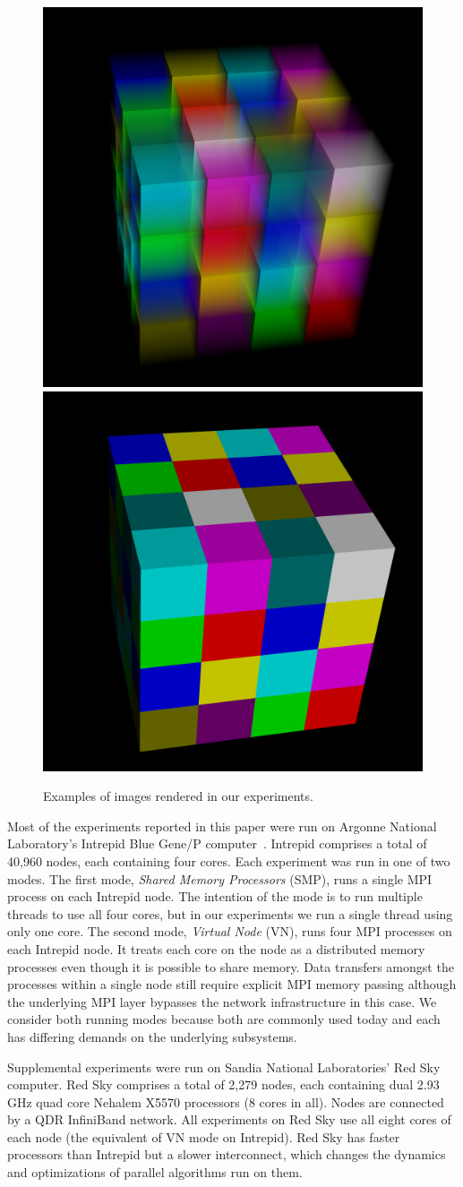 \documentclass{vgtc}                          %
\newcommand*{\lcite}[1]{~\cite{#1}}
\newcommand*{\keyterm}[1]{\emph{#1}}
\begin{document}
\begin{figure}[htbp]
  \centering
  \includegraphics[width=.4\linewidth]{images/TransparentOutput}
  \quad
  \includegraphics[width=.4\linewidth]{images/OpaqueOutput}
  \caption{Examples of images rendered in our experiments.}
  \label{fig:SimpleTimingOutput}
\end{figure}

Most of the experiments reported in this paper were run on Argonne National
Laboratory's Intrepid Blue Gene/P computer\lcite{BlueGeneP}.  Intrepid
comprises a total of 40,960 nodes, each containing four cores.  Each
experiment was run in one of two modes.  The first mode, \keyterm{Shared
  Memory Processors} (SMP), runs a single MPI process on each Intrepid
node.  The intention of the mode is to run multiple threads to use all four
cores, but in our experiments we run a single thread using only one core.
The second mode, \keyterm{Virtual Node} (VN), runs four MPI processes on
each Intrepid node.  It treats each core on the node as a distributed
memory processes even though it is possible to share memory.  Data
transfers amongst the processes within a single node still require explicit
MPI memory passing although the underlying MPI layer bypasses the network
infrastructure in this case.  We consider both running modes because both
are commonly used today and each has differing demands on the underlying
subsystems.

Supplemental experiments were run on Sandia National Laboratories' Red Sky
computer.  Red Sky comprises a total of 2,279 nodes, each containing dual
2.93 GHz quad core Nehalem X5570 processors (8 cores in all).  Nodes are
connected by a QDR InfiniBand network.  All experiments on Red Sky use all
eight cores of each node (the equivalent of VN mode on Intrepid).  Red Sky
has faster processors than Intrepid but a slower interconnect, which
changes the dynamics and optimizations of parallel algorithms run on them.
\end{document}
